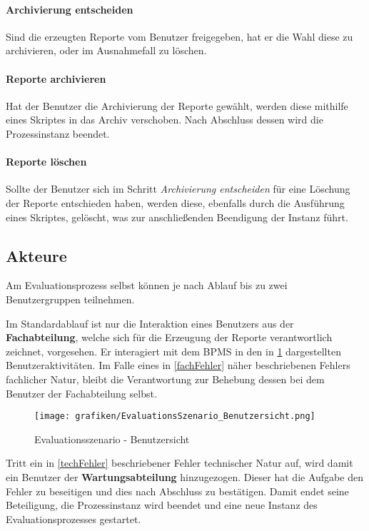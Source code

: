 \paragraph*{Archivierung entscheiden}
Sind die erzeugten Reporte vom Benutzer freigegeben, hat er die Wahl diese zu archivieren, oder im Ausnahmefall zu löschen.

\paragraph*{Reporte archivieren}
Hat der Benutzer die Archivierung der Reporte gewählt, werden diese mithilfe eines Skriptes in das Archiv verschoben. Nach Abschluss dessen wird die Prozessinstanz beendet.

\paragraph*{Reporte löschen}
Sollte der Benutzer sich im Schritt \textit{Archivierung entscheiden} für eine Löschung der Reporte entschieden haben, werden diese, ebenfalls durch die Ausführung eines Skriptes, gelöscht, was zur anschließenden Beendigung der Instanz führt.

\subsection{Akteure}
\label{akteure}
Am Evaluationsprozess selbst können je nach Ablauf bis zu zwei Benutzergruppen teilnehmen.

\label{fachabteilung}
\bigskip
\noindent Im Standardablauf ist nur die Interaktion eines Benutzers aus der  \textbf{Fachabteilung}, welche sich für die Erzeugung der Reporte verantwortlich zeichnet, vorgesehen. Er interagiert mit dem \ac{BPMS} in den in \ref{fig:benutzersicht} dargestellten Benutzeraktivitäten. Im Falle eines in \ref{fachFehler} näher beschriebenen Fehlers fachlicher Natur, bleibt die Verantwortung zur Behebung dessen bei dem Benutzer der Fachabteilung selbst.

\begin{figure}[!h]
	\caption{Evaluationsszenario - Benutzersicht}
	\centering
		\texttt{[image: grafiken/EvaluationsSzenario\_Benutzersicht.png]}	
	\label{fig:benutzersicht}
\end{figure}

\label{wartungsabteilung}
\bigskip
\noindent Tritt ein in \ref{techFehler} beschriebener Fehler technischer Natur auf, wird damit ein Benutzer der \textbf{Wartungsabteilung} hinzugezogen. Dieser hat die Aufgabe den Fehler zu beseitigen und dies nach Abschluss zu bestätigen. Damit endet seine Beteiligung, die Prozessinstanz wird beendet und eine neue Instanz des Evaluationsprozesses gestartet.

